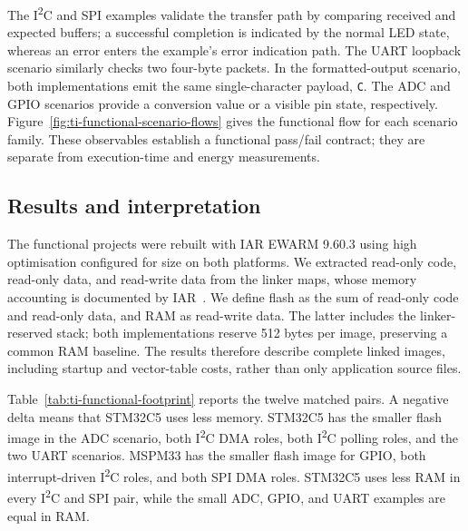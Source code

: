 The I\textsuperscript{2}C and SPI examples validate the transfer path by comparing received
and expected buffers; a successful completion is indicated by the normal LED state, whereas an
error enters the example's error indication path. The UART loopback scenario similarly checks
two four-byte packets. In the formatted-output scenario, both implementations emit the same
single-character payload, \texttt{C}. The ADC and GPIO scenarios provide a conversion value or
a visible pin state, respectively. Figure~\ref{fig:ti-functional-scenario-flows} gives the
functional flow for each scenario family. These observables establish a functional pass/fail
contract; they are separate from execution-time and energy measurements.

\subsection{Results and interpretation}
\label{subsec:ti-functional-results}

The functional projects were rebuilt with IAR EWARM 9.60.3 using high optimisation configured
for size on both platforms. We extracted read-only code, read-only data, and read-write data
from the linker maps, whose memory accounting is documented by IAR~\cite{iar-ewarm}. We define
flash as the sum of read-only code and read-only data, and RAM as read-write data. The latter
includes the linker-reserved stack; both implementations reserve 512 bytes per image,
preserving a common RAM baseline. The results therefore describe complete linked images,
including startup and vector-table costs, rather than only application source files.

Table~\ref{tab:ti-functional-footprint} reports the twelve matched pairs. A negative delta
means that STM32C5 uses less memory. STM32C5 has the smaller flash image in the ADC scenario,
both I\textsuperscript{2}C DMA roles, both I\textsuperscript{2}C polling roles, and the two
UART scenarios. MSPM33 has the smaller flash image for GPIO, both interrupt-driven I\textsuperscript{2}C
roles, and both SPI DMA roles. STM32C5 uses less RAM in every I\textsuperscript{2}C and SPI
pair, while the small ADC, GPIO, and UART examples are equal in RAM.

